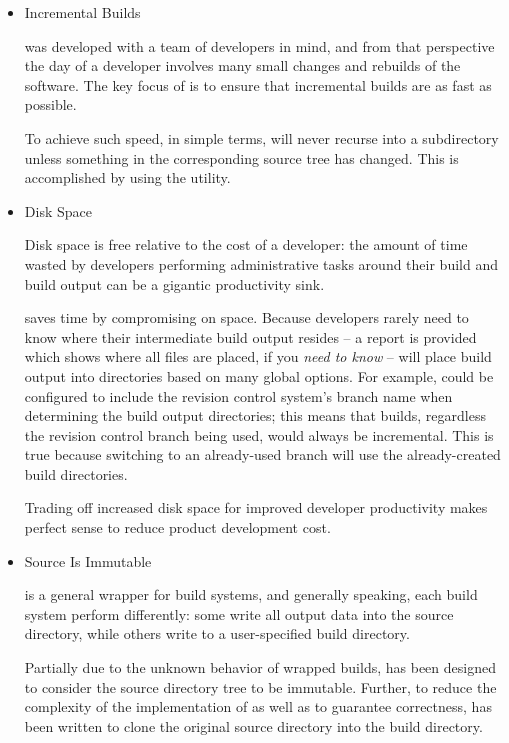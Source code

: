 \begin{itemize}
\item Incremental Builds

  \lmsbw was developed with a team of developers in mind, and from that
  perspective the day of a developer involves many small changes and
  rebuilds of the software.  The key focus of \lmsbw is to ensure that
  incremental builds are as fast as possible.

  To achieve such speed, in simple terms, \lmsbw will never recurse
  into a subdirectory unless something in the corresponding source
  tree has changed.  This is accomplished by using the \mtree utility.

\item Disk Space

  Disk space is free relative to the cost of a developer: the amount
  of time wasted by developers performing administrative tasks around
  their build and build output can be a gigantic productivity sink.

  \lmsbw saves time by compromising on space.  Because developers
  rarely need to know where their intermediate build output resides --
  a report is provided which shows where all files are placed, if you
  \emph{need to know} -- \lmsbw will place build output into
  directories based on many global options.  For example, \lmsbw could
  be configured to include the revision control system's branch name
  when determining the build output directories; this means that
  builds, regardless the revision control branch being used, would
  always be incremental.  This is true because switching to an
  already-used branch will use the already-created build directories.

  Trading off increased disk space for improved developer productivity
  makes perfect sense to reduce product development cost.

\item Source Is Immutable

  \lmsbw is a general wrapper for build systems, and generally
  speaking, each build system perform differently: some write all
  output data into the source directory, while others write to a
  user-specified build directory.

  Partially due to the unknown behavior of wrapped builds, \lmsbw has
  been designed to consider the source directory tree to be immutable.
  Further, to reduce the complexity of the implementation of \lmsbw as
  well as to guarantee correctness, \lmsbw has been written to clone
  the original source directory into the build directory.


\end{itemize}
